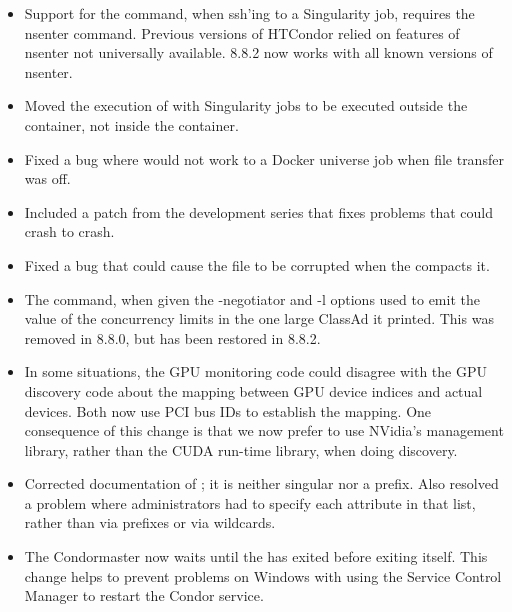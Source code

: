 \begin{itemize}

\item Support for the  command, when ssh'ing to a 
Singularity job, requires the nsenter command.  Previous versions of HTCondor
relied on features of nsenter not universally available.  8.8.2 now
works with all known versions of nsenter.

\item Moved the execution of  with Singularity jobs
to be executed outside the container, not inside the container.

\item Fixed a bug where  would not work to a Docker 
universe job when file transfer was off.

\item Included a patch from the development series that fixes problems that
could crash  to crash.

\item Fixed a bug that could cause the  file to
be corrupted when the  compacts it.

\item The  command, when given the -negotiator and -l options
used to emit the value of the concurrency limits in the one large ClassAd it
printed.  This was removed in 8.8.0, but has been restored in 8.8.2.

\item In some situations, the GPU monitoring code could disagree with the
GPU discovery code about the mapping between GPU device indices and actual
devices.  Both now use PCI bus IDs to establish the mapping.  One consequence
of this change is that we now prefer to use NVidia's management library,
rather than the CUDA run-time library, when doing discovery.

\item  Corrected documentation of ;
it is neither singular nor a prefix.  Also resolved a problem where
administrators had to specify each attribute in that list, rather than via
prefixes or via wildcards.

\item The Condor{master} now waits until the  has exited before exiting itself. This change
helps to prevent problems on Windows with using the Service Control Manager to restart the Condor service.


\end{itemize}
